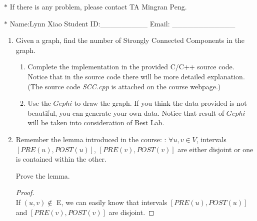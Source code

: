 \documentclass[12pt,a4paper]{article}
\theoremstyle{definition}
\begin{document}
\noindent

\noindent{}


\begin{center}
\footnotesize{\color{red}$*$ If there is any problem, please contact TA Mingran Peng.}\par
\footnotesize{\color{blue}$*$ Name:Lynn Xiao \quad Student ID:\_\_\_\_\_\_\_\_\_ \quad Email: \_\_\_\_\_\_\_\_\_\_\_\_}
\end{center}
\begin{enumerate}
    
    \item
    Given a graph, find the number of Strongly Connected Components in the graph.
    \begin{enumerate}
        \item
         Complete the implementation in the provided C/C++ source code. Notice that in the source code there will be more detailed explanation.{\color{blue}(The source code \emph{SCC.cpp} is attached on the course webpage.)}\par
       \item
        Use the $Gephi$ to draw the graph. If you think the data provided is not beautiful, you can generate your own data. Notice that result of $Gephi$ will be taken into consideration of Best Lab.\par 
        
    \end{enumerate}


\item
    Remember the lemma introduced in the course: : $\forall u, v \in V$, intervals $[PRE(u), POST(u)]$, $[PRE(v), POST(v)]$ are either disjoint or one is contained within the other.\par
Prove the lemma.\par
    \begin{proof}
       ~\\
       If $(u,v)\notin$ E, we can easily know that intervals $[PRE(u),POST(u)]$ and $[PRE(v),POST(v)]$ are disjoint.
       

\end{proof}
\end{enumerate}
\end{document}
